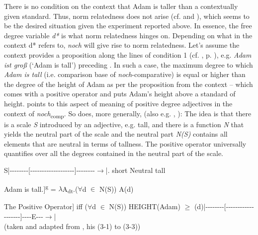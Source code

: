 \documentclass[output=paper,
modfonts
]{langscibook}
\begin{document}
\noindent There is no condition on the context that Adam is taller than a contextually given standard. Thus, norm relatedness does not arise (cf. \citealt{umbach2009a_comp} and ), which seems to be the desired situation given the experiment reported above. In essence, the free degree variable \textit{d*} is what norm relatedness hinges on. Depending on what in the context d* refers to, \textit{noch} will give rise to norm relatedness. Let's assume the context provides a proposition along the lines of condition 1 (cf. , p. \pageref{tab:4_conds}), e.g. \textit{Adam ist groß} (`Adam is tall') preceding . In such a case, the maximum degree to which \textit{Adam is tall} (i.e. comparison base of \textit{noch}-comparative) is equal or higher than the degree of the height of Adam as per the proposition from the context -- which comes with a positive operator and puts Adam's height above a standard of height. \citeauthor{umbach2009a_comp} \citeyearpar{umbach2009a_comp} points to this aspect of meaning of positive degree adjectives in the context of \textit{noch}\textsubscript{comp}. So does, more generally, \citeauthor{stechow2006} \citeyearpar{stechow2006}(also e.g. \citep{stechow1984}, \citep{Beck2011}): The idea is that there is a scale \textit{S} introduced by an adjective, e.g. tall, and there is a function \textit{N} that yields the neutral part of the scale and the neutral part \textit{N(S)} contains all elements that are neutral in terms of tallness. The positive operator universally quantifies over all the degrees contained in the neutral part of the scale. \citep{stechow2006}

\ea S\hspace{15pt}|{-}{-}{-}{-}{-}{-}{-}{-}{[}{-}{-}{-}{-}{-}{-}{-}{-}{-}{-}{-}{-}{-}{-}{-}{-}{-}{-}{-}{]}{-}{-}{-}{-}{-}{-}{-}{-}$\to$|\newline \tiny.\normalsize\hspace{22pt} short \hspace{20pt} Neutral \hspace{25pt} tall\z

\ea Adam is tall.\newline [[\textbf{Pos}\textsubscript{N,S}]]\textsuperscript{g} = $\lambda$A\textsubscript{dt}.(\textbf{$\forall$}d $\in$ N(S)) A(d) \z

\ea The Positive Operator\newline [[\textbf{Pos}\textsubscript{N,S}$\lambda$d.tall\textsubscript{S}(d)(Adam)]] iff ($\forall$d $\in$ N(S)) HEIGHT(Adam) $\geq$ (d)\newline|{-}{-}{-}{-}{-}{-}{-}{-}{[}{-}{-}{-}{-}{-}{-}{-}{-}{-}{-}{-}{-}{-}{-}{-}{-}{-}{-}{-}{]}{-}{-}{-}{-}{E}{-}{-}{-}$\to$| \\ (taken and adapted from \citeauthor{stechow2006} \citeyearpar{stechow2006}, his (3-1) to (3-3))\z
\end{document}

